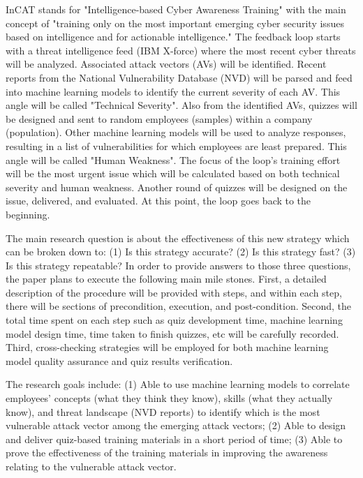 \documentclass[conference]{IEEEtran}
\begin{document}
InCAT stands for "Intelligence-based Cyber Awareness Training" with the main concept of "training only on the most important emerging cyber security issues based on intelligence and for actionable intelligence." The feedback loop starts with a threat intelligence feed (IBM X-force) where the most recent cyber threats will be analyzed. Associated attack vectors (AVs) will be identified. Recent reports from the National Vulnerability Database (NVD) will be parsed and feed into machine learning models to identify the current severity of each AV. This angle will be called "Technical Severity". Also from the identified AVs, quizzes will be designed and sent to random employees (samples) within a company (population). Other machine learning models will be used to analyze responses, resulting in a list of vulnerabilities for which employees are least prepared. This angle will be called "Human Weakness". The focus of the loop's training effort will be the most urgent issue which will be calculated based on both technical severity and human weakness. Another round of quizzes will be designed on the issue, delivered, and evaluated. At this point, the loop goes back to the beginning.

The main research question is about the effectiveness of this new strategy which can be broken down to: (1) Is this strategy accurate? (2) Is this strategy fast? (3) Is this strategy repeatable? In order to provide answers to those three questions, the paper plans to execute the following main mile stones. First, a detailed description of the procedure will be provided with steps, and within each step, there will be sections of precondition, execution, and post-condition. Second, the total time spent on each step such as quiz development time, machine learning model design time, time taken to finish quizzes, etc will be carefully recorded. Third, cross-checking strategies will be employed for both machine learning model quality assurance and quiz results verification. 

The research goals include: (1) Able to use machine learning models to correlate employees' concepts (what they think they know), skills (what they actually know), and threat landscape (NVD reports) to identify which is the most vulnerable attack vector among the emerging attack vectors;  (2) Able to design and deliver quiz-based training materials in a short period of time;  (3) Able to prove the effectiveness of the training materials in improving the awareness relating to the vulnerable attack vector.
\end{document}

